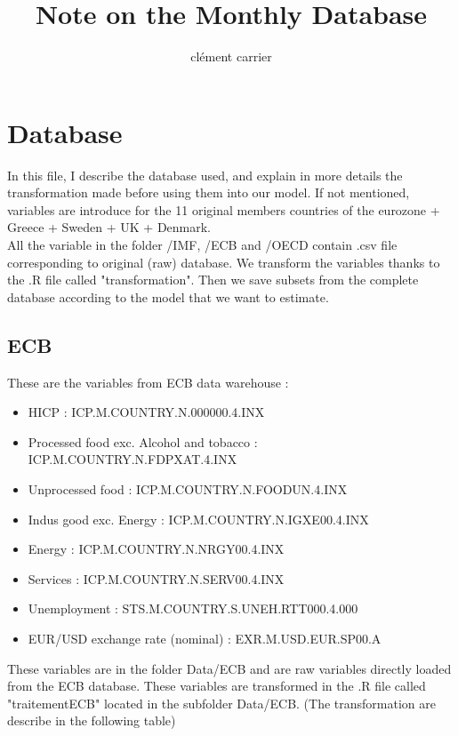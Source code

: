 \documentclass[11pt,a4paper]{article}
\title{Note on the Monthly Database}
\author{clément carrier}
\begin{document}
\maketitle

\section{Database}

In this file, I describe the database used, and explain in more details the transformation made before using them into our model. If not mentioned, variables are introduce for the 11 original members countries of the eurozone + Greece + Sweden + UK + Denmark.\\

All the variable in the folder /IMF, /ECB and /OECD contain .csv file corresponding to original (raw) database. We transform the variables thanks to the .R file called "transformation". Then we save subsets from the complete database according to the model that we want to estimate. 




\subsection{ECB}

These are the variables from ECB data warehouse :
\begin{itemize}
\item HICP : ICP.M.COUNTRY.N.000000.4.INX
\item Processed food exc. Alcohol and tobacco : ICP.M.COUNTRY.N.FDPXAT.4.INX
\item Unprocessed food	: ICP.M.COUNTRY.N.FOODUN.4.INX
\item Indus good exc. Energy : ICP.M.COUNTRY.N.IGXE00.4.INX
\item Energy	:	ICP.M.COUNTRY.N.NRGY00.4.INX
\item Services	:	ICP.M.COUNTRY.N.SERV00.4.INX
\item Unemployment : STS.M.COUNTRY.S.UNEH.RTT000.4.000
\item EUR/USD exchange rate (nominal) : EXR.M.USD.EUR.SP00.A
\end{itemize}

\vspace{0.5cm}

These variables are in the folder Data/ECB and are raw variables directly loaded from the ECB database. These variables are transformed in the .R file called "traitementECB" located in the subfolder Data/ECB. (The transformation are describe in the following table) \\
\end{document}
